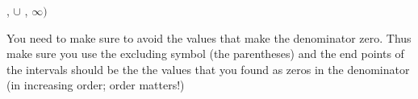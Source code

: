 \documentclass{ximera}
\begin{document}
\begin{problem}
\begin{problem}
{                
                },
            \wordChoice{
                \choice{$($}
                \choice{$[$}
                \choice{$]$}
                \choice[correct]{$)$}
                }
                $\cup$
            \wordChoice{
                \choice[correct]{$($}
                \choice{$[$}
                \choice{$]$}
                \choice{$)$}
                }
            ,
            $\infty)$
            \begin{feedback}
                You need to make sure to avoid the values that make the denominator zero. Thus make sure you use the excluding symbol (the parentheses) and the end points of the intervals should be the the values that you found as zeros in the denominator (in increasing order; order matters!)
            \end{feedback}
    \end{problem}
\end{problem}
\end{document}
